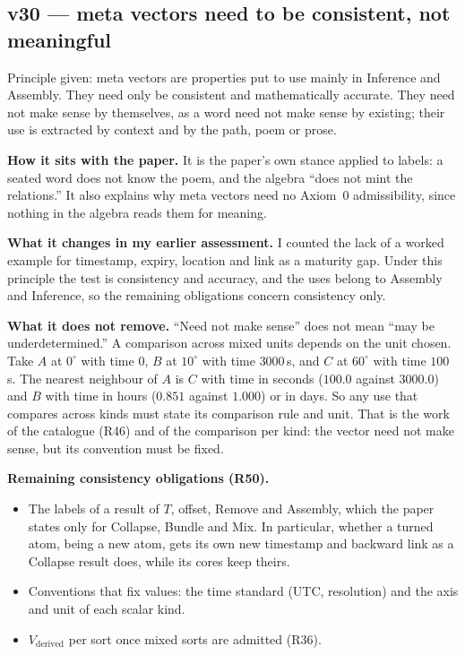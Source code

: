 \documentclass[11pt]{article}
\begin{document}
\subsection*{v30 --- meta vectors need to be consistent, not meaningful}
Principle given: meta vectors are properties put to use mainly in Inference
and Assembly. They need only be consistent and mathematically accurate.
They need not make sense by themselves, as a word need not make sense by
existing; their use is extracted by context and by the path, poem or prose.

\textbf{How it sits with the paper.} It is the paper's own stance applied to
labels: a seated word does not know the poem, and the algebra ``does not
mint the relations.'' It also explains why meta vectors need no Axiom~0
admissibility, since nothing in the algebra reads them for meaning.

\textbf{What it changes in my earlier assessment.} I counted the lack of a
worked example for timestamp, expiry, location and link as a maturity gap.
Under this principle the test is consistency and accuracy, and the uses
belong to Assembly and Inference, so the remaining obligations concern
consistency only.

\textbf{What it does not remove.} ``Need not make sense'' does not mean
``may be underdetermined.'' A comparison across mixed units depends on the
unit chosen. Take $A$ at $0^\circ$ with time $0$, $B$ at $10^\circ$ with
time $3000$\,s, and $C$ at $60^\circ$ with time $100$\,s. The nearest
neighbour of $A$ is $C$ with time in seconds ($100.0$ against $3000.0$) and
$B$ with time in hours ($0.851$ against $1.000$) or in days. So any use
that compares across kinds must state its comparison rule and unit. That is
the work of the catalogue (R46) and of the comparison per kind: the vector
need not make sense, but its convention must be fixed.

\textbf{Remaining consistency obligations (R50).}
\begin{itemize}
\item The labels of a result of $T$, offset, Remove and Assembly, which the
paper states only for Collapse, Bundle and Mix. In particular, whether a
turned atom, being a new atom, gets its own new timestamp and backward
link as a Collapse result does, while its cores keep theirs.
\item Conventions that fix values: the time standard (UTC, resolution) and
the axis and unit of each scalar kind.
\item $V_{\text{derived}}$ per sort once mixed sorts are admitted (R36).
\end{itemize}
\end{document}
